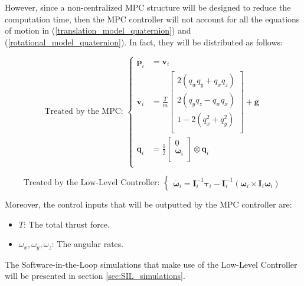 \documentclass{thesisreport}
\begin{document}
However, since a non-centralized MPC structure will be designed to reduce the computation time, then the MPC controller will not account for all the equations of motion in (\ref{translation_model_quaternion}) and (\ref{rotational_model_quaternion}). In fact, they will be distributed as follows: 

				\begin{equation*}
					\text{Treated by the MPC: }\left\{
					\begin{array}{lll}				
					\dot{\bm{p}_i} &= \bm{v}_i \\
					\dot{\bm{v}_i} &= 
					\frac{T}{m} 
					\begin{bmatrix}
						2 (q_w q_y + q_x q_z) \\
						2 (q_y q_z - q_w q_x) \\
						1 - 2(q_x^2 + q_y^2 ) \\
					\end{bmatrix} + \bm{g} \\			
					\dot{\bm{q}_i} & = \frac{1}{2}
					\begin{bmatrix}
						0 \\
						\bm{\omega}_i \\
					\end{bmatrix} \otimes \bm{q}_i \\
					\end{array}
					\right.
				\end{equation*}
				
				\begin{equation*}
					\text{Treated by the Low-Level Controller: }\left\{
					\begin{array}{l}	
					\dot{\bm{\omega}_i} = \bm{I}_i^{-1} \bm{\tau}_i - \bm{I}_i^{-1} (\bm{\omega}_i \times \bm{I}_i \bm{\omega}_i)
					\end{array}
					\right.
				\end{equation*}

Moreover, the control inputs that will be outputted by the MPC controller are: 

\begin{itemize}
	\item $T$: The total thrust force.
	\item $\omega_x, \omega_y, \omega_z$: The angular rates. 
\end{itemize} 

The Software-in-the-Loop simulations that make use of the Low-Level Controller will be presented in section \ref{sec:SIL_simulations}.
\end{document}
